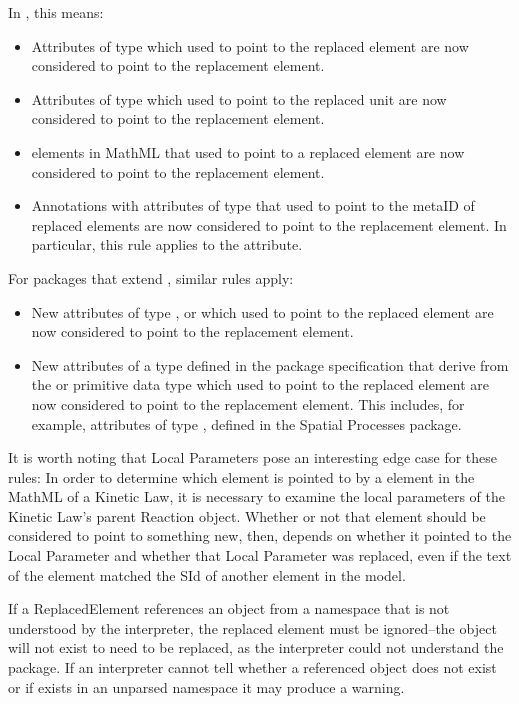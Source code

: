 In \sbmlthreecore, this means: 
\begin{itemize}
\item Attributes of type  which used to point to the replaced element 
 are now considered to point to the replacement element. 
\item Attributes of type  which used to point to the replaced 
 unit are now considered to point to the replacement element. 
\item {} elements in MathML that used to point to a replaced element are 
 now considered to point to the replacement element. 
\item Annotations with attributes of type  that used to point to 
 the metaID of replaced elements are now considered to point to the 
 replacement element. In particular, this rule applies to the 
  attribute.
\end{itemize}

For packages that extend \sbmlthreecore, similar rules apply: 
\begin{itemize}
\item New attributes of type ,  
 or  which used to point 
 to the replaced element are now considered to point to the replacement 
 element.  
\item New attributes of a type defined in the package specification that 
 derive from the  or  primitive data type which used to 
 point to the replaced element are now considered to point to the 
 replacement element. This includes, for example, attributes of type 
 , defined in the Spatial Processes package. 
\end{itemize}

It is worth noting that Local Parameters pose an interesting edge case 
for these rules: In order to determine which element is pointed to by a 
 element in the MathML of a Kinetic Law, it is necessary to examine 
the local parameters of the Kinetic Law's parent Reaction object. 
Whether or not that  element should be considered to point to 
something new, then, depends on whether it pointed to the Local 
Parameter and whether that Local Parameter was replaced, even if the 
text of the element matched the SId of another element in the model. 

If a ReplacedElement references an object from a namespace that is not
understood by the interpreter, the replaced element must be ignored--the 
object will not exist to need to be replaced, as the interpreter could not
understand the package.  If an interpreter cannot tell whether 
a referenced object does not exist or if exists in an unparsed namespace
it may produce a warning.

